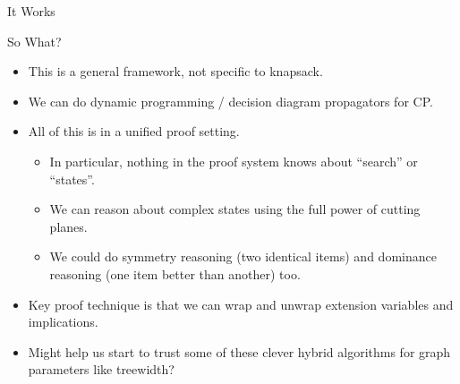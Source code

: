 \documentclass[aspectratio=169,compress,10pt]{beamer}
\begin{document}
\begin{frame}{It Works}
\end{frame}

\begin{frame}{So What?}
    \begin{itemize}
        \item This is a general framework, not specific to knapsack.
        \item We can do dynamic programming / decision diagram propagators for CP.
        \item All of this is in a unified proof setting.
            \begin{itemize}
                \item In particular, nothing in the proof system knows about ``search'' or
                    ``states''.
                \item We can reason about complex states using the full power of cutting
                    planes.
                \item We could do symmetry reasoning (two identical items) and dominance reasoning
                    (one item better than another) too.
            \end{itemize}
        \item Key proof technique is that we can wrap and unwrap extension variables and implications.
        \item Might help us start to trust some of these clever hybrid algorithms
            for graph parameters like treewidth?
    \end{itemize}
\end{frame}
\end{document}
